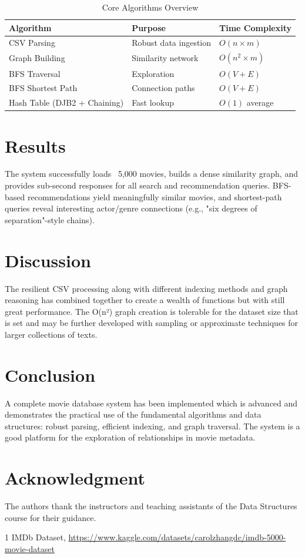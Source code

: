 \documentclass[conference]{IEEEtran}
\begin{document}
\begin{table}[t]
\centering
\caption{Core Algorithms Overview}
\begin{tabular}{l l l}
\toprule
\textbf{Algorithm} & \textbf{Purpose} & \textbf{Time Complexity} \\
\midrule
CSV Parsing & Robust data ingestion & $O(n \times m)$ \\
Graph Building & Similarity network & $O(n^2 \times m)$ \\
BFS Traversal & Exploration & $O(V+E)$ \\
BFS Shortest Path & Connection paths & $O(V+E)$ \\
Hash Table (DJB2 + Chaining) & Fast lookup & $O(1)$ average \\
\bottomrule
\end{tabular}
\end{table}

\section{Results}
The system successfully loads ~5,000 movies, builds a dense similarity graph, and provides sub-second responses for all search and recommendation queries. BFS-based recommendations yield meaningfully similar movies, and shortest-path queries reveal interesting actor/genre connections (e.g., "six degrees of separation"-style chains).

\section{Discussion}
The resilient CSV processing along with different indexing methods and graph reasoning has combined together to create a wealth of functions but with still great performance. The O(n²) graph creation is tolerable for the dataset size that is set and may be further developed with sampling or approximate techniques for larger collections of texts.

\section{Conclusion}
A complete movie database system has been implemented which is advanced and demonstrates the practical use of the fundamental algorithms and data structures: robust parsing, efficient indexing, and graph traversal. The system is a good platform for the exploration of relationships in movie metadata.

\section*{Acknowledgment}
The authors thank the instructors and teaching assistants of the Data Structures course for their guidance.


\begin{thebibliography}{1}
IMDb Dataset, \url{https://www.kaggle.com/datasets/carolzhangdc/imdb-5000-movie-dataset}
\end{thebibliography}
\end{document}
